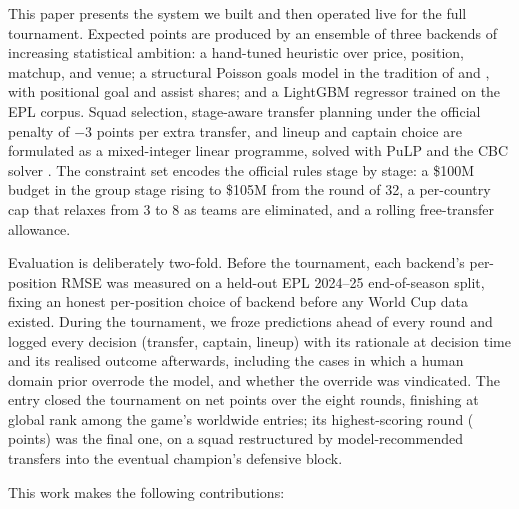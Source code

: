 This paper presents the system we built and then operated live for
the full tournament. Expected points are produced by an ensemble of
three backends of increasing statistical ambition: a hand-tuned
heuristic over price, position, matchup, and venue; a structural
Poisson goals model in the tradition of \citet{maher1982modelling}
and \citet{dixon1997modelling}, with positional goal and assist
shares; and a LightGBM regressor \citep{ke2017lightgbm} trained on
the EPL corpus. Squad selection, stage-aware transfer planning under
the official penalty of $-3$ points per extra transfer, and lineup
and captain choice are formulated as a mixed-integer linear
programme, solved with PuLP and the CBC solver \citep{pulp, cbc}.
The constraint set encodes the official rules stage by stage: a
\$100M budget in the group stage rising to \$105M from the round of
32, a per-country cap that relaxes from 3 to 8 as teams are
eliminated, and a rolling free-transfer allowance.

Evaluation is deliberately two-fold. Before the tournament, each
backend's per-position RMSE was measured on a held-out EPL 2024--25
end-of-season split, fixing an honest per-position choice of backend
before any World Cup data existed. During the tournament, we froze
predictions ahead of every round and logged every decision (transfer,
captain, lineup) with its rationale at decision time and its realised
outcome afterwards, including the cases in which a human domain prior
overrode the model, and whether the override was vindicated. The
entry closed the tournament on \TotalUserActualNet{} net points over
the eight rounds, finishing at global rank \GlobalRankFinal{} among
the game's worldwide entries; its highest-scoring round
(\FinalRoundNet{} points) was the final one, on a squad
restructured by model-recommended transfers into the eventual
champion's defensive block.

This work makes the following contributions:

